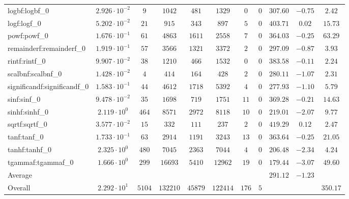 \begin{tabular}{|l|c|c|c|c|c|c|c|c|c|c|}
logbf:logbf\_0               & $ 2.926 \cdot 10^{-2} $ & $ 9      $ & $ 1042   $ & $ 481   $ & $ 1329   $ & $ 0   $ & $ 0 $ & $ 307.60      $ & $ -0.75   $ & $ 2.42    $ \\
logf:logf\_0                 & $ 5.202 \cdot 10^{-2} $ & $ 21     $ & $ 915    $ & $ 343   $ & $ 897    $ & $ 5   $ & $ 0 $ & $ 403.71      $ & $ 0.02    $ & $ 15.73   $ \\
powf:powf\_0                 & $ 1.676 \cdot 10^{-1} $ & $ 61     $ & $ 4863   $ & $ 1611  $ & $ 2558   $ & $ 7   $ & $ 0 $ & $ 364.03      $ & $ -0.25   $ & $ 63.29   $ \\
remainderf:remainderf\_0     & $ 1.919 \cdot 10^{-1} $ & $ 57     $ & $ 3566   $ & $ 1321  $ & $ 3372   $ & $ 2   $ & $ 0 $ & $ 297.09      $ & $ -0.87   $ & $ 3.93    $ \\
rintf:rintf\_0               & $ 9.907 \cdot 10^{-2} $ & $ 38     $ & $ 1210   $ & $ 466   $ & $ 1532   $ & $ 0   $ & $ 0 $ & $ 383.58      $ & $ -0.11   $ & $ 2.24    $ \\
scalbnf:scalbnf\_0           & $ 1.428 \cdot 10^{-2} $ & $ 4      $ & $ 414    $ & $ 164   $ & $ 428    $ & $ 2   $ & $ 0 $ & $ 280.11      $ & $ -1.07   $ & $ 2.31    $ \\
significandf:significandf\_0 & $ 1.583 \cdot 10^{-1} $ & $ 44     $ & $ 4612   $ & $ 1718  $ & $ 5392   $ & $ 4   $ & $ 0 $ & $ 277.93      $ & $ -1.10   $ & $ 5.79    $ \\
sinf:sinf\_0                 & $ 9.478 \cdot 10^{-2} $ & $ 35     $ & $ 1698   $ & $ 719   $ & $ 1751   $ & $ 11  $ & $ 0 $ & $ 369.28      $ & $ -0.21   $ & $ 14.63   $ \\
sinhf:sinhf\_0               & $ 2.119 \cdot 10^{0}  $ & $ 464    $ & $ 8571   $ & $ 2972  $ & $ 8118   $ & $ 10  $ & $ 0 $ & $ 219.01      $ & $ -2.07   $ & $ 9.77    $ \\
sqrtf:sqrtf\_0               & $ 3.577 \cdot 10^{-2} $ & $ 15     $ & $ 332    $ & $ 111   $ & $ 237    $ & $ 2   $ & $ 0 $ & $ 419.29      $ & $ 0.12    $ & $ 2.47    $ \\
tanf:tanf\_0                 & $ 1.733 \cdot 10^{-1} $ & $ 63     $ & $ 2914   $ & $ 1191  $ & $ 3243   $ & $ 13  $ & $ 0 $ & $ 363.64      $ & $ -0.25   $ & $ 21.05   $ \\
tanhf:tanhf\_0               & $ 2.325 \cdot 10^{0}  $ & $ 480    $ & $ 7045   $ & $ 2363  $ & $ 7044   $ & $ 4   $ & $ 0 $ & $ 206.48      $ & $ -2.34   $ & $ 4.24    $ \\
tgammaf:tgammaf\_0           & $ 1.666 \cdot 10^{0}  $ & $ 299    $ & $ 16693  $ & $ 5410  $ & $ 12962  $ & $ 19  $ & $ 0 $ & $ 179.44      $ & $ -3.07   $ & $ 49.60   $ \\
\hline
Average                      & $                     $ & $        $ & $        $ & $       $ & $        $ & $     $ & $   $ & $ 291.12      $ & $ -1.23   $ & $         $ \\
\hline
Overall                      & $ 2.292 \cdot 10^{1}  $ & $ 5104   $ & $ 132210 $ & $ 45879 $ & $ 122414 $ & $ 176 $ & $ 5 $ & $             $ & $         $ & $ 350.17  $ \\
\hline
\end{tabular}
